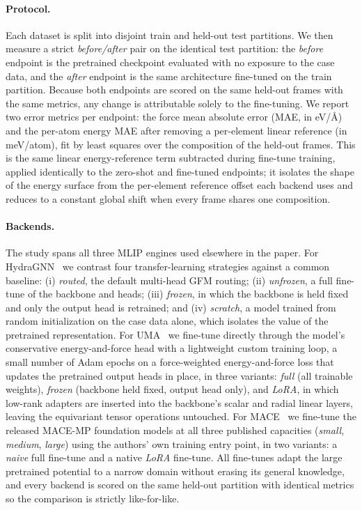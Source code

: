 \documentclass[conference]{IEEEtran}
\def\ac#1{#1}%
\def\acs#1{#1}%
\begin{document}
\paragraph{Protocol.}
Each dataset is split into disjoint train and held-out test partitions. We then
measure a strict \emph{before/after} pair on the identical test partition: the
\emph{before} endpoint is the pretrained checkpoint evaluated with no exposure to
the case data, and the \emph{after} endpoint is the same architecture
fine-tuned on the train partition. Because both endpoints are scored on the same
held-out frames with the same metrics, any change is attributable solely to the
fine-tuning. We report two error metrics per endpoint: the force mean absolute
error (\acs{MAE}, in eV/\AA) and the per-atom energy \acs{MAE} after removing a
per-element linear reference (in meV/atom), fit by least squares over the
composition of the held-out frames. This is the same linear energy-reference
term subtracted during fine-tune training, applied identically to the zero-shot
and fine-tuned endpoints; it isolates the shape of the energy surface from the
per-element reference offset each backend uses and reduces to a constant global
shift when every frame shares one composition.

\paragraph{Backends.}
The study spans all three \acs{MLIP} engines used elsewhere in the paper. For
HydraGNN~\cite{hydragnn} we contrast four transfer-learning strategies against a
common baseline: (i) \emph{routed}, the default multi-head \ac{GFM} routing;
(ii) \emph{unfrozen}, a full fine-tune of the backbone and heads; (iii)
\emph{frozen}, in which the backbone is held fixed and only the output head is
retrained; and (iv) \emph{scratch}, a model trained from random initialization
on the case data alone, which isolates the value of the pretrained
representation. For UMA~\cite{wood2025uma} we fine-tune directly through the
model's conservative energy-and-force head with a lightweight custom training
loop, a small number of Adam epochs on a force-weighted energy-and-force loss
that updates the pretrained output heads in place, in three variants:
\emph{full} (all trainable weights), \emph{frozen} (backbone held fixed, output
head only), and \emph{LoRA}, in which low-rank adapters are inserted into the
backbone's scalar and radial linear layers, leaving the equivariant tensor
operations untouched. For MACE~\cite{batatia2022,batatia2023macemp} we fine-tune
the released MACE-MP foundation models at all three published capacities
(\emph{small}, \emph{medium}, \emph{large}) using the authors' own training
entry point, in two variants: a \emph{naive} full fine-tune and a native
\emph{LoRA} fine-tune. All fine-tunes adapt the large pretrained potential to a
narrow domain without erasing its general knowledge, and every backend is scored
on the same held-out partition with identical metrics so the comparison is
strictly like-for-like.
\end{document}
